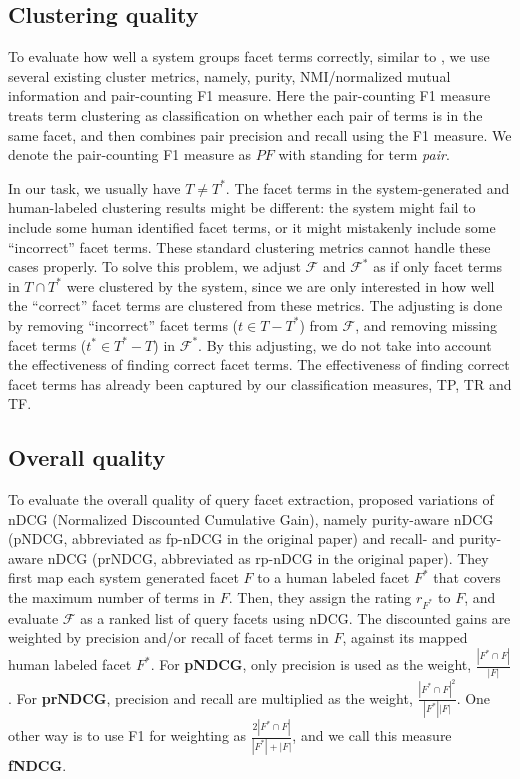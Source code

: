 \subsection{Clustering quality}
\label{sec:intrinsic-pmeasures}
To evaluate how well a system groups facet terms correctly,
similar to \citet{dou2011finding}, we use several existing cluster metrics, namely, purity, NMI/normalized mutual information and pair-counting F1 measure. Here the pair-counting F1 measure treats term clustering as classification on whether each pair of terms is in the same facet, and then combines pair precision and recall using the F1 measure. We denote the pair-counting F1 measure as $P\!F$ with  standing for term \emph{pair}.


In our task, we usually have $T\neq T^*$. The facet terms in the system-generated and human-labeled clustering results might be different: the system might fail to include some human identified facet terms, or it might mistakenly include some ``incorrect'' facet terms. These standard clustering metrics cannot handle these cases properly. To solve this problem, we adjust $\mathcal{F}$ and $\mathcal{F}^*$ as if only facet terms in $T \cap T^{*}$ were clustered by the system, since we are only interested in how well the ``correct'' facet terms are clustered from these metrics. The adjusting is done by removing ``incorrect'' facet terms ($t \in T-T^*$) from $\mathcal{F}$, and removing missing facet terms ($t^{*}\in T^*-T$) in $\mathcal{F}^{*}$.  By this adjusting, we do not take into account the effectiveness of finding correct facet terms. The effectiveness of finding correct facet terms has already been captured by our classification measures, TP, TR and TF.

\subsection{Overall quality}
\label{sec:evalmetricsall}
To evaluate the overall quality of query facet extraction, \citet{dou2011finding} proposed variations of nDCG (Normalized Discounted Cumulative Gain), namely purity-aware nDCG (pNDCG, abbreviated as fp-nDCG in the original paper) and recall- and purity-aware nDCG (prNDCG, abbreviated as rp-nDCG in the original paper). They first map each system generated facet $F$ to a human labeled facet $F^*$ that covers the maximum number of terms in $F$. Then, they assign the rating $r_{F^*}$ to $F$, and evaluate $\mathcal{F}$ as a ranked list of query facets using nDCG.
The discounted gains are weighted by precision and/or recall of facet terms in $F$, against its mapped human labeled facet $F^*$. For \textbf{pNDCG}, only precision is used as the weight, $\frac{|F^* \cap F|}{|F|}$.
For \textbf{prNDCG}, precision and recall are multiplied as the weight, $\frac{|F^* \cap F|^2}{|F^*||F|}$. One other way is to use F1 for weighting as $\frac{2|F^* \cap F|}{|F^*| + |F|}$, and we call this measure \textbf{fNDCG}.

